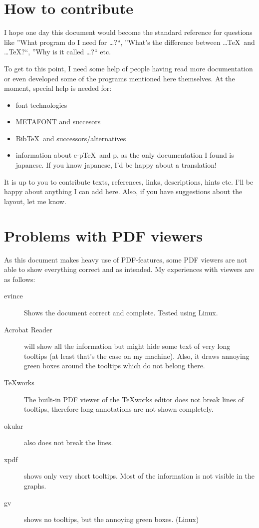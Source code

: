 \section{How to contribute}
I hope one day this document would become the standard reference for questions like ”What program do I need for …?“, ”What's the difference between …\TeX\ and …\TeX?“, ”Why is it called …?“ etc.

To get to this point, I need some help of people having read more documentation or even developed some of the programs mentioned here themselves. At the moment, special help is needed for:
\begin{itemize}
\item font technologies
\item METAFONT and succesors
\item Bib\TeX\ and successors/alternatives
\item information about e-p\TeX\ and p\BibTeX, as the only documentation I found is japanese. If you know japanese, I'd be happy about a translation!
\end{itemize}

It is up to you to contribute texts, references, links, descriptions, hints etc. I'll be happy about anything I can add here. Also, if you have suggestions about the layout, let me know.

\section{Problems with PDF viewers}
As this document makes heavy use of PDF-features, some PDF viewers are not able to show everything correct and as intended. My experiences with viewers are as follows:

\begin{description}
\item[evince] Shows the document correct and complete. Tested using Linux.

\item[Acrobat Reader] will show all the information but might hide some text of very long tooltips (at least that's the case on my machine). Also, it draws annoying green boxes around the tooltips which do not belong there.

\item[TeXworks] The built-in PDF viewer of the TeXworks editor does not break lines of tooltips, therefore long annotations are not shown completely.

\item[okular] also does not break the lines.

\item[xpdf] shows only very short tooltips. Most of the information is not visible in the graphs.

\item[gv] shows no tooltips, but the annoying green boxes. (Linux)
\end{description}

